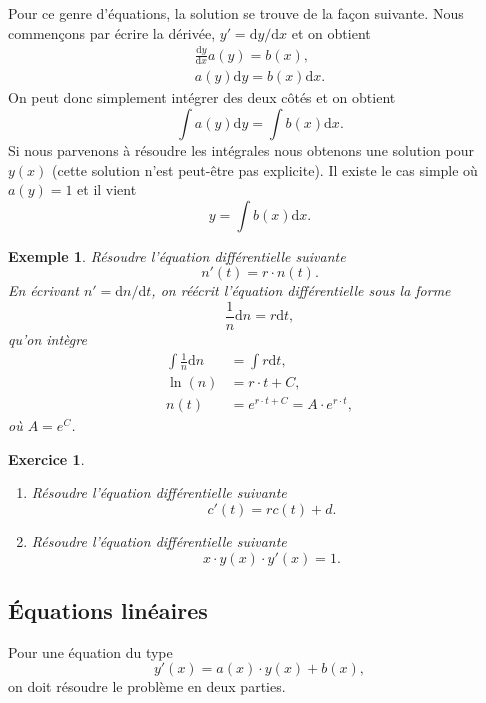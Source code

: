 \documentclass[a4paper,12pt]{book}
\newcommand{\dd}{\mathrm{d}}
\newtheorem*{exemple}{Exemple}
\newtheorem*{exercice}{Exercice}
\begin{document}
Pour ce genre d'équations, la solution se trouve de la façon suivante.
Nous commençons par écrire la dérivée, $y'=\dd y/\dd x$ et on obtient
\begin{align}
 \frac{\dd y}{\dd x} a(y)=b(x),\\
 a(y)\dd y=b(x)\dd x.
\end{align}
On peut donc simplement intégrer des deux côtés et on obtient
\begin{equation}
 \int a(y)\dd y=\int b(x)\dd x.
\end{equation}
Si nous parvenons à résoudre les intégrales nous obtenons une solution pour $y(x)$ (cette solution n'est peut-être pas explicite).
Il existe le cas simple où $a(y)=1$ et il vient
\begin{equation}
 y=\int b(x)\dd x.
\end{equation}

\begin{exemple}
 Résoudre l'équation différentielle suivante
 \begin{equation}
n'(t)=r\cdot n(t).  
 \end{equation}
En écrivant $n'=\dd n /\dd t$, on réécrit l'équation différentielle sous la forme
\begin{equation}
\frac{1}{n} \dd n=r\dd t,
 \end{equation}
qu'on intègre
\begin{align}
\int \frac{1}{n} \dd n&=\int r\dd t,\nonumber\\
\ln(n)&=r\cdot t+C,\nonumber\\
n(t)&=e^{r\cdot t+C}=A\cdot e^{r\cdot t},
\end{align}
où $A=e^C$.
\end{exemple}

\begin{exercice}
\hfill\break
\begin{enumerate}
 \item Résoudre l'équation différentielle suivante
\begin{equation}
c'(t)=rc(t)+d.
\end{equation}
 \item Résoudre l'équation différentielle suivante
\begin{equation}
x\cdot y(x) \cdot y'(x)=1.
\end{equation}
\end{enumerate}
\end{exercice}

\subsection{Équations linéaires}\label{sec_eq_lin}
Pour une équation du type
\begin{equation}
 y'(x)=a(x)\cdot y(x)+b(x),\label{eq_lin}
 \end{equation}
on doit résoudre le problème en deux parties. 
\end{document}
